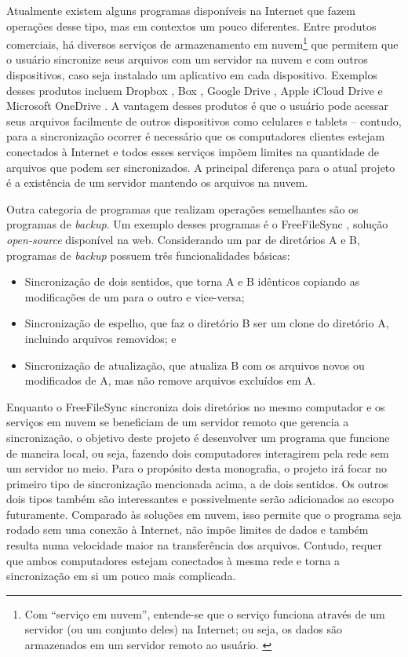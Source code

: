 \documentclass[12pt,a4paper]{ufpr}
\begin{document}
Atualmente existem alguns programas disponíveis na Internet que fazem operações desse tipo, mas em contextos um pouco diferentes. 
Entre produtos comerciais, há diversos serviços de armazenamento em nuvem\footnote{Com ``serviço em nuvem'', entende-se que o serviço funciona através de um servidor (ou um conjunto deles) na Internet; ou seja, os dados são armazenados em um servidor remoto ao usuário. \cite{mell2011nist}} que permitem que o usuário sincronize seus arquivos com um servidor na nuvem e com outros dispositivos, caso seja instalado um aplicativo em cada dispositivo. 
Exemplos desses produtos incluem Dropbox \cite{dropbox}, Box \cite{box}, Google Drive \cite{googledrive}, Apple iCloud Drive \cite{icloud} e Microsoft OneDrive \cite{onedrive}.
A vantagem desses produtos é que o usuário pode acessar seus arquivos facilmente de outros dispositivos como celulares e tablets \--- contudo, para a sincronização ocorrer é necessário que os computadores clientes estejam conectados à Internet e todos esses serviços impõem limites na quantidade de arquivos que podem ser sincronizados.
A principal diferença para o atual projeto é a existência de um servidor mantendo os arquivos na nuvem.

Outra categoria de programas que realizam operações semelhantes são os programas de \textit{backup}.
Um exemplo desses programas é o FreeFileSync \cite{freefilesync}, solução \textit{open-source} disponível na web.
Considerando um par de diretórios A e B, programas de \textit{backup} possuem três funcionalidades básicas:
\begin{itemize}
    \item Sincronização de dois sentidos, que torna A e B idênticos copiando as modificações de um para o outro e vice-versa;
    \item Sincronização de espelho, que faz o diretório B ser um clone do diretório A, incluindo arquivos removidos; e
    \item Sincronização de atualização, que atualiza B com os arquivos novos ou modificados de A, mas não remove arquivos excluídos em A.
\end{itemize}


Enquanto o FreeFileSync sincroniza dois diretórios no mesmo computador e os serviços em nuvem se beneficiam de um servidor remoto que gerencia a sincronização, o objetivo deste projeto é desenvolver um programa que funcione de maneira local, ou seja, fazendo dois computadores interagirem pela rede sem um servidor no meio.
Para o propósito desta monografia, o projeto irá focar no primeiro tipo de sincronização mencionada acima, a de dois sentidos.
Os outros dois tipos também são interessantes e possivelmente serão adicionados ao escopo futuramente.
Comparado às soluções em nuvem, isso permite que o programa seja rodado sem uma conexão à Internet, não impõe limites de dados e também resulta numa velocidade maior na transferência dos arquivos.
Contudo, requer que ambos computadores estejam conectados à mesma rede e torna a sincronização em si um pouco mais complicada.
\end{document}
